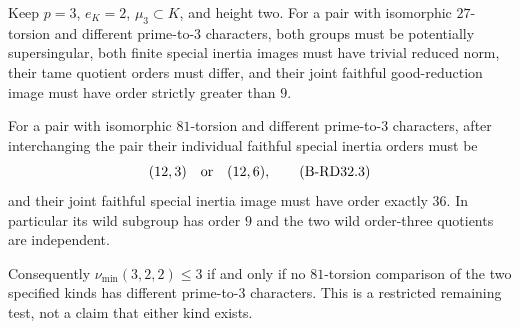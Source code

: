 \begin{proposition}
\label{prop:B-RD32}
Keep $p=3$, $e_K=2$, $\mu_3\subset K$, and height two.
For a pair with isomorphic $27$-torsion and different
prime-to-$3$ characters, both groups must be potentially
supersingular, both finite special inertia images must have
trivial reduced norm, their tame quotient orders must differ,
and their joint faithful good-reduction image must have order
strictly greater than $9$.

For a pair with isomorphic $81$-torsion and different
prime-to-$3$ characters, after interchanging the pair their
individual faithful special inertia orders must be
\[
                             (12,3)\quad\hbox{or}\quad(12,6),
                                                        \tag{B-RD32.3}
\]
and their joint faithful special inertia image must have
order exactly $36$. In particular its wild subgroup has
order $9$ and the two wild order-three quotients are
independent.

Consequently $\nu_{\min}(3,2,2)\leq3$ if and only if
no $81$-torsion comparison of the two specified kinds has
different prime-to-$3$ characters. This is a restricted
remaining test, not a claim that either kind exists.
\end{proposition}

